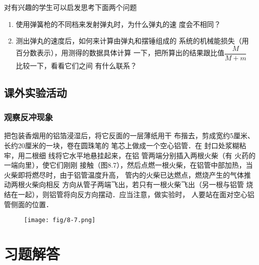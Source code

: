 对有兴趣的学生可以启发思考下面两个问题
\begin{enumerate}
\item 使用弹簧枪的不同档来发射弹丸时，为什么弹丸的速
度会不相同？
\item 测出弹丸的速度后，如何来计算由弹丸和摆锤组成的
系统的机械能损失（用百分数表示），用测得的数据具体计算
一下，把所算出的结果跟比值$\dfrac{M}{M+m}$
比较一下，看看它们之间
有什么联系？
\end{enumerate}

\subsection{课外实验活动}
\subsubsection{观察反冲现象}
把包装香烟用的铝箔浸湿后，将它反面的一层薄纸用干
布揩去，剪成宽约5厘米、长约20厘米的一块，卷在圆珠笔的
笔芯上做成一个空心铝管．在
封口处浆糊粘牢，用二根细
线将它水平地悬挂起来，在铝
管两端分别插入两根火柴（有
火药的一端向里），使它们刚刚
接触（图8.7），然后点燃一根火柴，在铝管中部加热，当火柴即将燃尽时，由于铝管温度升高，
管内的火柴已达燃点，燃烧产生的气体推动两根火柴向相反
方向从管子两端飞出，若只有一根火柴飞出（另一根与铝管
烧结在一起），则铝管将向反方向摆动．应当注意，做实验时，
人要站在面对空心铝管侧面的位置．

\begin{figure}[htp]
    \centering
    \texttt{[image: fig/8-7.png]}
    \caption{}
\end{figure}



\section{习题解答}

